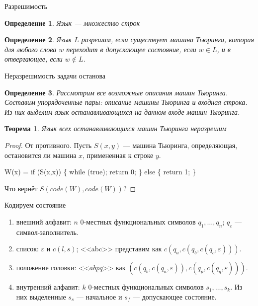 \documentclass[aspectratio=169]{beamer}
\newtheorem{thm}{Теорема}[section]
\newtheorem{dfn}{Определение}[section]
\begin{document}
\newcommand\doubleplus{+\kern-1.3ex+\kern0.8ex}
\newcommand\mdoubleplus{\ensuremath{\mathbin{+\mkern-10mu+}}}


\begin{frame}{Разрешимость}
\begin{dfn}Язык --- множество строк\end{dfn}
\begin{dfn}Язык $L$ разрешим, если существует машина Тьюринга, которая для любого слова $w$ переходит в допускающее состояние, если $w \in L$,
и в отвергающее, если $w \notin L$.\end{dfn}
\end{frame}

\begin{frame}{Неразрешимость задачи останова}
\begin{dfn}Рассмотрим все возможные описания машин Тьюринга. Составим упорядоченные пары: описание машины Тьюринга и входная строка.
Из них выделим язык останавливающихся на данном входе машин Тьюринга.\end{dfn}
\begin{thm}Язык всех останавливающихся машин Тьюринга неразрешим\end{thm}
\begin{proof}От противного. Пусть $S(x,y)$ --- машина Тьюринга, определяющая, остановится ли машина $x$, примененная к строке $y$.\pause
\begin{center}W(x) = if (S(x,x)) \{ while (true); return 0; \} else \{ return 1; \}\end{center}\pause
Что вернёт $S(code(W),code(W))$?
\end{proof}
\end{frame}

\begin{frame}{Кодируем состояние}
\begin{enumerate}
\item внешний алфавит: $n$ 0-местных функциональных символов $q_1, \dots, q_n$; $q_\varepsilon$ --- символ-заполнитель.
\item список: $\varepsilon$ и $c(l,s)$; <<abc>> представим как $c(q_a,c(q_b,c(q_c,\varepsilon)))$.
\item положение головки: <<$ab\underline{p}q$>> как $(c(q_b,c(q_a,\varepsilon)), c(q_p,c(q_q,\varepsilon)))$.
\item внутренний алфавит: $k$ 0-местных функциональных символов $s_1, \dots, s_k$. Из них выделенные $s_s$ --- начальное и
$s_f$ --- допускающее состояние.
\end{enumerate}
\end{frame}
\end{document}
